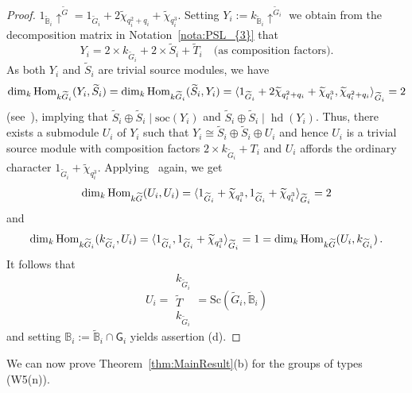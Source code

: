 \documentclass[12pt,a4paper]{amsart}
\theoremstyle{plain}\newtheorem{Theorem}{Theorem}[section]
\theoremstyle{plain}\newtheorem{Conjecture}[Theorem]{Conjecture}
\theoremstyle{plain}\newtheorem{Corollary}[Theorem]{Corollary}
\theoremstyle{plain}\newtheorem{Lemma}[Theorem]{Lemma}
\theoremstyle{plain}\newtheorem{Proposition}[Theorem]{Proposition}
\theoremstyle{definition}\newtheorem{Definition}[Theorem]{Definition}
\theoremstyle{definition}\newtheorem{Example}[Theorem]{Example}
\theoremstyle{definition}\newtheorem{Examples}[Theorem]{Examples}
\theoremstyle{definition}\newtheorem{Remark}[Theorem]{Remark}
\theoremstyle{definition}\newtheorem{Question}[Theorem]{Question}
\theoremstyle{definition}\newtheorem{Notation}[Theorem]{Notation}
\theoremstyle{definition}\newtheorem{Hypothesis}[Theorem]{Hypothesis}
\theoremstyle{definition}\newtheorem{Assumption}[Theorem]{Assumption}
\theoremstyle{definition}\newtheorem{Strategy}[Theorem]{Strategy}
\theoremstyle{definition}\newtheorem{Contents}[Theorem]{Contents}
\theoremstyle{definition}\newtheorem{Computations}[Theorem]{Computations}
\theoremstyle{definition}\newtheorem{Equivalences}[Theorem]{Equivalences}
\theoremstyle{definition}\newtheorem{Notation/Definition}[Theorem]{Notation/Definition}
\theoremstyle{definition}\newtheorem{noth}[Theorem]{}
\theoremstyle{plain}\newtheorem{Step}[Theorem]{Step}
\def\dim{\mathrm{dim}}
\def\soc{\mathrm{soc}} \def\tenOS{\otimes_{\mathcal{O}S}} \def\Tr{\mathrm{Tr}}
\newcommand{\hd}{\operatorname{hd}}
\newcommand{\Sc}{{\text{Sc}}}
\begin{document}
\begin{proof}
$1_{\widetilde{\mathbb B}_{i}}{\uparrow}^{\widetilde G} 
= 1_{\widetilde{G}_{i}} +2\widetilde\chi_{q_{i}^2+q_{i}}+\widetilde\chi_{q_{i}^3}$.
Setting 
$Y_{i}:={k_{\widetilde{\mathbb B}_{i}}}{\uparrow}^{\widetilde G_{i}}$ we obtain from the decomposition matrix in Notation~\ref{nota:PSL_{3}}  that 
$$Y_{i} = 2\times k_{\widetilde G_{i}} + 2\times\widetilde S_{i}+ \widetilde T_{i}\quad \text{(as
composition factors).}$$
As both $Y_{i}$ and $\widetilde S_{i}$ are trivial source modules, we have
$$\dim_{k}\,\Hom_{k\widetilde {G}_{i}}(Y_{i},\widetilde {S}_{i})
=\dim_{k}\,\Hom_{k\widetilde{G}_{i}}(\widetilde{S}_{i}, Y_{i})
=\langle 1_{\widetilde G_{i}}  +2\widetilde\chi_{q_{i}^2+q_{i}}
+\widetilde\chi_{q_{i}^3}, \widetilde\chi_{q_{i}^{2}+q_{i}} \rangle^{}_{\widetilde G_{i}} = 2$$
(see~\cite[II Theorem 12.4(iii)]{Lan83}), implying that  $\widetilde S_{i}\oplus  \widetilde  S_{i}\mid \soc(Y_{i})$ and $\widetilde  S_{i}\oplus \widetilde  S_{i}\mid  \hd(Y_{i})$. 
Thus, there exists a submodule $U_{i}$ of $Y_{i}$ such that  $Y_{i}\cong \widetilde S_{i}\oplus \widetilde S_{i}\oplus U_{i}$
and hence $U_{i}$ is a trivial source module with composition factors
$2\times k_{\widetilde G_{i}}+T_{i}$ and $U_{i}$ affords the ordinary character $1_{\widetilde{G}_{i}}+\widetilde\chi_{q_{i}^3}$. Applying~\cite[II Theorem 12.4(iii)]{Lan83} again, we get 
$$\dim_k\,\Hom_{k\widetilde G}(U_{i},U_{i})=\langle 1_{\widetilde{G}_{i}}+\widetilde\chi_{q_{i}^3},  1_{\widetilde{G}_{i}}+\widetilde\chi_{q_{i}^3}  \rangle^{}_{\widetilde G_{i}} =2$$
and 
$$\dim_k\,\Hom_{k\widetilde G_{i}}(k_{\widetilde G_{i}}, U_{i})=\langle 1_{\widetilde{G}_{i}}, 1_{\widetilde{G}_{i}}+\widetilde\chi_{q_{i}^3}  \rangle^{}_{\widetilde G_{i}} =1
=\dim_k\,\Hom_{k\widetilde G}(U_{i}, k_{\widetilde G_{i}})\,.$$
It follows that 
\begin{equation*}\label{Scott}
U_{i} =
\boxed{\begin{matrix} k_{\widetilde G_{i}}\\ \widetilde T \\ k_{\widetilde G_{i}}
\end{matrix}}
= \Sc(\widetilde G_{i}, \widetilde{\mathbb B}_{i})
\end{equation*}
and setting ${\mathbb B}_{i}:=\widetilde{\mathbb B}_{i}\cap \mathsf{G}_{i}$ yields assertion (d).
\end{proof}

\noindent We can now prove Theorem~\ref{thm:MainResult}(b) for  the groups of types {\sf (W5(n))}. 
\end{document}
